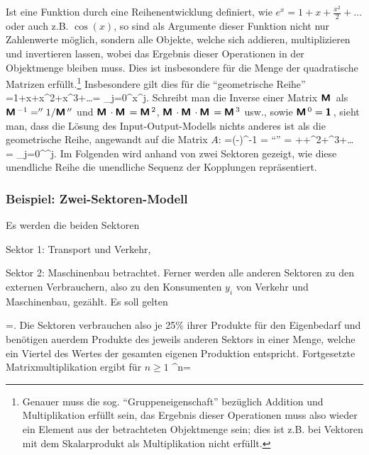 Ist eine Funktion durch eine Reihenentwicklung definiert, wie
$e^x=1+x+\frac{x^2}{2}+\ldots$ oder auch z.B. $\cos(x)$, so sind als Argumente
dieser Funktion nicht nur Zahlenwerte m\"oglich, sondern alle Objekte,
welche sich addieren, multiplizieren und invertieren
lassen, wobei das Ergebnis dieser Operationen in der Objektmenge
bleiben muss. Dies ist insbesondere f\"ur die Menge der
quadratische Matrizen erf\"ullt.\footnote{Genauer muss die sog. ``Gruppeneigenschaft''
bez\"uglich Addition und Multiplikation erf\"ullt sein, das Ergebnis
dieser Operationen muss also wieder ein Element aus der betrachteten Objektmenge sein; dies ist
z.B. bei Vektoren mit dem Skalarprodukt als Multiplikation nicht erf\"ullt.}
Insbesondere gilt dies f\"ur die ``geometrische Reihe''
\bdm
{}=1+x+x^2+x^3+\ldots = \sum\limits_{j=0}^{\infty}x^j.
\edm
Schreibt man die Inverse einer Matrix $\textbf{\textsf{M}}\,$ als
$\textbf{\textsf{M}}\,^{-1}=''1/\textbf{\textsf{M}}\,''$ und $\textbf{\textsf{M}}\,\cdot\textbf{\textsf{M}}\,=\textbf{\textsf{M}}\,^2$,
$\textbf{\textsf{M}}\,\cdot\textbf{\textsf{M}}\,\cdot\textbf{\textsf{M}}\,=\textbf{\textsf{M}}\,^3$ usw.,  sowie $\textbf{\textsf{M}}\,^0=\textbf{\textsf{1}}\,$,
sieht man, dass die L\"osung des
Input-Output-Modells nichts anderes ist als die geometrische Reihe,
angewandt auf die Matrix $A$:
\be
\label{IOMgeomReihe}
=\left(-\right)^{-1}
= ``''
= ++^2+^3+\ldots
= \sum\limits_{j=0}^{\infty}^j.
\ee
Im Folgenden wird anhand von zwei Sektoren gezeigt, wie diese
unendliche Reihe die unendliche Sequenz der Kopplungen
repr\"asentiert.

\subsubsection{Beispiel: Zwei-Sektoren-Modell}
Es werden die beiden Sektoren
\bi
\item Sektor 1: Transport und Verkehr,
\item Sektor 2: Maschinenbau
\ei
betrachtet. Ferner werden alle anderen Sektoren zu den externen Verbrauchern,
also zu den Konsumenten $y_i$ von Verkehr und Maschinenbau, gez\"ahlt.
Es soll gelten


\bdm
{}=.
\edm
Die Sektoren verbrauchen also je 25\% ihrer Produkte f\"ur den
Eigenbedarf und ben\"otigen au\3erdem Produkte des jeweils anderen
Sektors in einer Menge, welche ein Viertel des Wertes der gesamten eigenen Produktion
entspricht.
Fortgesetzte Matrixmultiplikation ergibt f\"ur $n\ge 1$
\bdm
{}^n=
\edm

